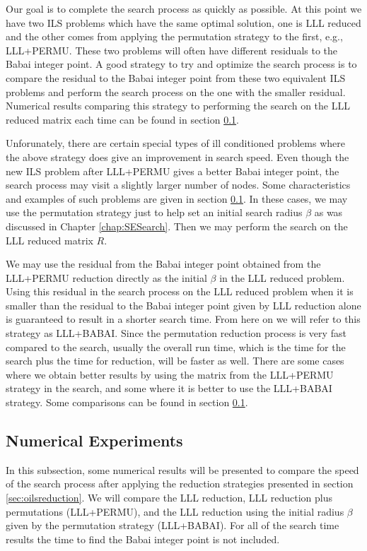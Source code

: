 \documentclass[12pt,Bold,letterpaper]{mcgilletdclass}
\newcommand{\vsp}{\vspace{\baselineskip}}
\begin{document}
Our goal is to complete the search process as quickly as possible. At this point we have two ILS problems which have the same optimal solution, one is LLL reduced and the other comes from applying the permutation strategy to the first, e.g., LLL+PERMU. These two problems will often have different residuals to the Babai integer point. A good strategy to try and optimize the search process is to compare the residual to the Babai integer point from these two equivalent ILS problems and perform the search process on the one with the smaller residual. Numerical results comparing this strategy to performing the search on the LLL reduced matrix each time can be found in section \ref{sec:ILSReductionResults}.

Unforunately, there are certain special types of ill conditioned problems where the above strategy does give an improvement in search speed. Even though the new ILS problem after LLL+PERMU gives a better Babai integer point, the search process may visit a slightly larger number of nodes. Some characteristics and examples of such problems are given in section \ref{sec:ILSReductionResults}. In these cases, we may use the permutation strategy just to help set an initial search radius $\beta$ as was discussed in Chapter \ref{chap:SESearch}. Then we may perform the search on the LLL reduced matrix $R$.

We may use the residual from the Babai integer point obtained from the LLL+PERMU reduction directly as the initial $\beta$ in the LLL reduced problem. Using this residual in the search process on the LLL reduced problem when it is smaller than the residual to the Babai integer point given by LLL reduction alone is guaranteed to result in a shorter search time. From here on we will refer to this strategy as LLL+BABAI. Since the permutation reduction process is very fast compared to the search, usually the overall run time, which is the time for the search plus the time for reduction, will be faster as well. There are some cases where we obtain better results by using the matrix from the LLL+PERMU strategy in the search, and some where it is better to use the LLL+BABAI strategy. Some comparisons can be found in section \ref{sec:ILSReductionResults}.

\vsp \subsection{Numerical Experiments} \label{sec:ILSReductionResults}
In this subsection, some numerical results will be presented to compare the speed of the search process after applying the reduction strategies presented in section \ref{sec:oilsreduction}. We will compare the LLL reduction, LLL reduction plus permutations (LLL+PERMU), and the LLL reduction using the initial radius $\beta$ given by the permutation strategy (LLL+BABAI). For all of the search time results the time to find the Babai integer point is not included.
\end{document}

